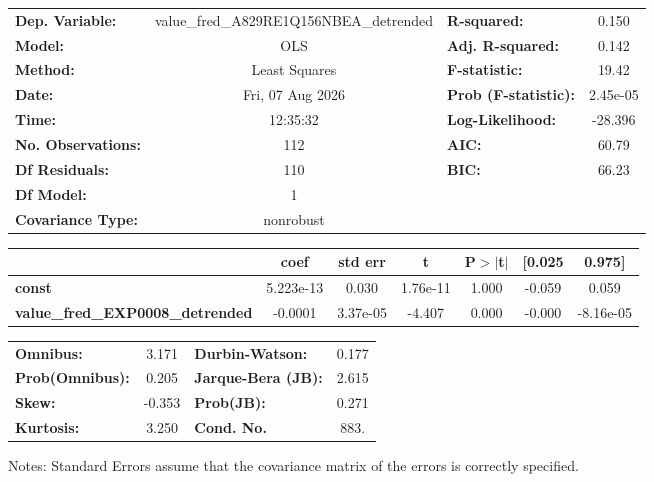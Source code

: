 \begin{center}
\begin{tabular}{lclc}
\toprule
\textbf{Dep. Variable:}                  & value\_fred\_A829RE1Q156NBEA\_detrended & \textbf{  R-squared:         } &     0.150   \\
\textbf{Model:}                          &                   OLS                   & \textbf{  Adj. R-squared:    } &     0.142   \\
\textbf{Method:}                         &              Least Squares              & \textbf{  F-statistic:       } &     19.42   \\
\textbf{Date:}                           &             Fri, 07 Aug 2026            & \textbf{  Prob (F-statistic):} &  2.45e-05   \\
\textbf{Time:}                           &                 12:35:32                & \textbf{  Log-Likelihood:    } &   -28.396   \\
\textbf{No. Observations:}               &                     112                 & \textbf{  AIC:               } &     60.79   \\
\textbf{Df Residuals:}                   &                     110                 & \textbf{  BIC:               } &     66.23   \\
\textbf{Df Model:}                       &                       1                 & \textbf{                     } &             \\
\textbf{Covariance Type:}                &                nonrobust                & \textbf{                     } &             \\
\bottomrule
\end{tabular}
\begin{tabular}{lcccccc}
                                         & \textbf{coef} & \textbf{std err} & \textbf{t} & \textbf{P$> |$t$|$} & \textbf{[0.025} & \textbf{0.975]}  \\
\midrule
\textbf{const}                           &    5.223e-13  &        0.030     &  1.76e-11  &         1.000        &       -0.059    &        0.059     \\
\textbf{value\_fred\_EXP0008\_detrended} &      -0.0001  &     3.37e-05     &    -4.407  &         0.000        &       -0.000    &    -8.16e-05     \\
\bottomrule
\end{tabular}
\begin{tabular}{lclc}
\textbf{Omnibus:}       &  3.171 & \textbf{  Durbin-Watson:     } &    0.177  \\
\textbf{Prob(Omnibus):} &  0.205 & \textbf{  Jarque-Bera (JB):  } &    2.615  \\
\textbf{Skew:}          & -0.353 & \textbf{  Prob(JB):          } &    0.271  \\
\textbf{Kurtosis:}      &  3.250 & \textbf{  Cond. No.          } &     883.  \\
\bottomrule
\end{tabular}
\end{center}

Notes: \newline
 [1] Standard Errors assume that the covariance matrix of the errors is correctly specified.